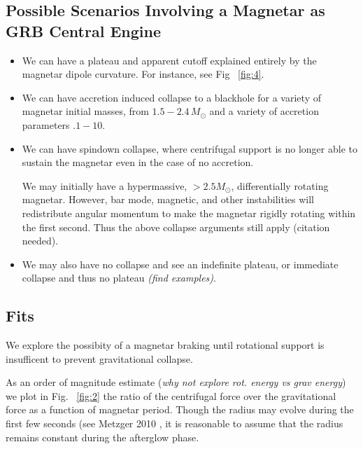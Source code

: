 \documentclass{article}
\begin{document}
\subsection{Possible Scenarios Involving a Magnetar as GRB Central Engine}

\begin{itemize}
\item We can have a plateau and apparent cutoff explained entirely by the magnetar dipole curvature. For instance, see Fig  ~\ref{fig:4}. \newline

\item We can have accretion induced collapse to a blackhole for a variety of magnetar initial masses, from $1.5-2.4\, M_{\odot}$ and a variety of accretion parameters $.1-10$. \newline

\item We can have spindown collapse, where centrifugal support is no longer able to sustain the magnetar even in the case of no accretion. \newline 

We may initially have a hypermassive, $>2.5 M_{\odot}$,  differentially rotating magnetar. However, bar mode, magnetic, and other instabilities will redistribute angular momentum to make the magnetar rigidly rotating within the first second. Thus the above collapse arguments still apply (citation needed). \newline

\item We may also  have no collapse and see an indefinite plateau, or immediate collapse and thus no plateau \textit{(find examples)}.

\end{itemize}
\subsection{Fits}

We explore the possibity of a magnetar braking until rotational support is insufficent to prevent gravitational collapse.

As an order of magnitude estimate (\textit{why not explore rot. energy vs grav energy}) we plot in Fig. ~\ref{fig:2} the ratio of the centrifugal force over the gravitational force as a function of magnetar period. Though the radius may evolve during the first few seconds (see Metzger 2010 \cite{Metzger:2010pp}, it is reasonable to assume that the radius remains constant during the afterglow phase.
\end{document}
